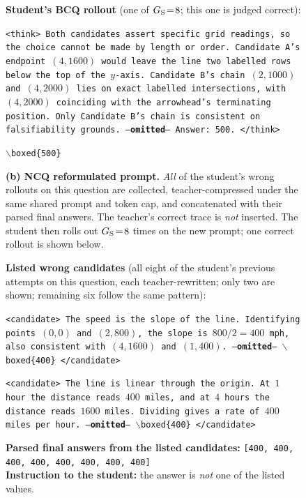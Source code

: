 \documentclass{llmxive}
\begin{document}
\begin{figure}[!p]
\begin{prompttemplatefig}
\textbf{Student's BCQ rollout} (one of $G_{\rm S}\!=\!8$; this one is judged correct):

\smallskip
\texttt{<think> Both candidates assert specific grid readings, so the choice cannot be made by length or order. Candidate~A's endpoint $(4, 1600)$ would leave the line two labelled rows below the top of the $y$-axis. Candidate~B's chain $(2, 1000)$ and $(4, 2000)$ lies on exact labelled intersections, with $(4, 2000)$ coinciding with the arrowhead's terminating position. Only Candidate~B's chain is consistent on falsifiability grounds. ---\textbf{omitted}--- Answer: 500. </think>}

\smallskip
\texttt{$\backslash$boxed\{500\}} \quad \checkmark
\end{prompttemplatefig}

\vspace{1pt}\noindent\textbf{(b) NCQ reformulated prompt.} \emph{All} of the student's wrong rollouts on this question are collected, teacher-compressed under the same shared prompt and token cap, and concatenated with their parsed final answers. The teacher's correct trace is \emph{not} inserted. The student then rolls out $G_{\rm S}\!=\!8$ times on the new prompt; one correct rollout is shown below.

\begin{negcandidatebox}
\textbf{Listed wrong candidates} (all eight of the student's previous attempts on this question, each teacher-rewritten; only two are shown; remaining six follow the same pattern):

\smallskip
\texttt{<candidate> The speed is the slope of the line. Identifying points $(0, 0)$ and $(2, 800)$, the slope is $800/2 = 400$ mph, also consistent with $(4, 1600)$ and $(1, 400)$. ---\textbf{omitted}--- $\backslash$boxed\{400\} </candidate>}

\smallskip
\texttt{<candidate> The line is linear through the origin. At $1$ hour the distance reads $400$ miles, and at $4$ hours the distance reads $1600$ miles. Dividing gives a rate of $400$ miles per hour. ---\textbf{omitted}--- $\backslash$boxed\{400\} </candidate>}

\smallskip
\textbf{Parsed final answers from the listed candidates:} \texttt{[400, 400, 400, 400, 400, 400, 400, 400]} \\
\textbf{Instruction to the student:} the answer is \emph{not} one of the listed values.
\end{negcandidatebox}


\end{figure}
\end{document}
